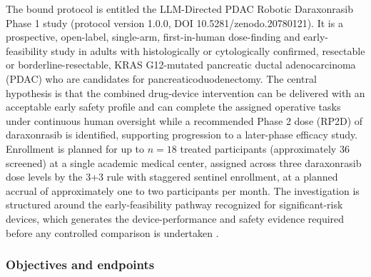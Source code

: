 The bound protocol is entitled the LLM-Directed PDAC Robotic Daraxonrasib Phase 1
study (protocol version 1.0.0, DOI 10.5281/zenodo.20780121). It is a prospective,
open-label, single-arm, first-in-human dose-finding and early-feasibility study in
adults with histologically or cytologically confirmed, resectable or
borderline-resectable, KRAS G12-mutated pancreatic ductal adenocarcinoma (PDAC)
who are candidates for pancreaticoduodenectomy. The central hypothesis is that the
combined drug-device intervention can be delivered with an acceptable early safety
profile and can complete the assigned operative tasks under continuous human
oversight while a recommended Phase 2 dose (RP2D) of daraxonrasib is identified,
supporting progression to a later-phase efficacy study. Enrollment is planned for
up to $n=18$ treated participants (approximately 36 screened) at a single academic
medical center, assigned across three daraxonrasib dose levels by the 3+3 rule
with staggered sentinel enrollment, at a planned accrual of approximately one to
two participants per month. The investigation is structured around the
early-feasibility pathway recognized for significant-risk devices, which generates
the device-performance and safety evidence required before any controlled
comparison is undertaken \cite{phase1guidance,daraxwhipple}.

\subsubsection*{Objectives and endpoints}

